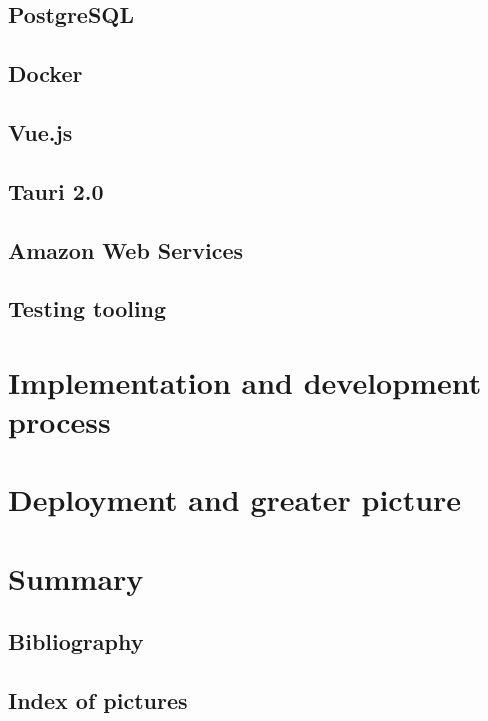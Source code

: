 \documentclass[12pt, a4paper]{article}
\begin{document}
\subsection{PostgreSQL}
\subsection{Docker}
\subsection{Vue.js}
\subsection{Tauri 2.0}
\subsection{Amazon Web Services}
\subsection{Testing tooling}
\section{Implementation and development process}
\section{Deployment and greater picture}
\section*{Summary}
\subsection*{Bibliography}
\subsection*{Index of pictures}
\end{document}
